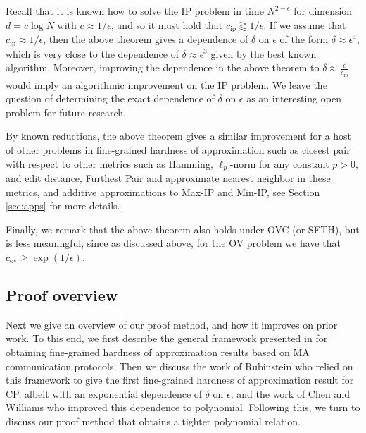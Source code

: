 \documentclass[11pt]{article}
\theoremstyle{plain}
\theoremstyle{remark}
\newcommand{\iP}{\mathrm{ip}}
\newcommand{\ov}{\mathrm{ov}}
\begin{document}
Recall that it is known how to solve the IP problem in time $N^{2-\epsilon}$ for dimension $d = c \log N$ with 
$c\approx 1/\epsilon$, and so it must hold that $c_{\iP}  \gtrapprox 1/\epsilon$. If we assume that $c_{\iP} \approx 1/\epsilon$, then the above theorem gives a dependence of $\delta$ on $\epsilon$ of the form $\delta \approx \epsilon^4 $, which is very close to the dependence of $\delta \approx \epsilon^3$ given by the best known algorithm. Moreover, improving the dependence in the above theorem to $\delta \approx \frac \epsilon {c_{\iP}}$ would imply an algorithmic improvement on the IP problem. We leave the question of determining the exact dependence of $\delta$ on $\epsilon$ as an interesting open problem for future research.

By known reductions, the above theorem gives a similar improvement for a host of other problems in fine-grained hardness of approximation such as closest pair with respect to other metrics such as Hamming,  $\ell_p$-norm for any constant $p>0$, and edit distance, Furthest Pair and approximate nearest neighbor in these metrics, and additive approximations to Max-IP and Min-IP, see Section \ref{sec:apps} for more details. 

Finally, we remark that the above theorem also holds under OVC (or SETH), but is less meaningful, since as discussed above, for the OV problem we have that $c_{\ov} \geq \exp(1/\epsilon)$. 

\subsection{Proof overview}

Next we give an overview of our proof method, and how it improves on prior work. To this end, we first describe the general framework presented in \cite{ARW17} for obtaining fine-grained hardness of approximation results based on MA communication protocols. Then we discuss the work of Rubinstein \cite{Rub18} who relied on this framework to give the first fine-grained hardness of approximation result for CP, albeit with an exponential dependence of $\delta$ on $\epsilon$, and the work of Chen and Williams \cite{CW19} who improved this dependence to polynomial. Following this, we turn to discuss our proof method that obtains a tighter polynomial relation.
\end{document}
